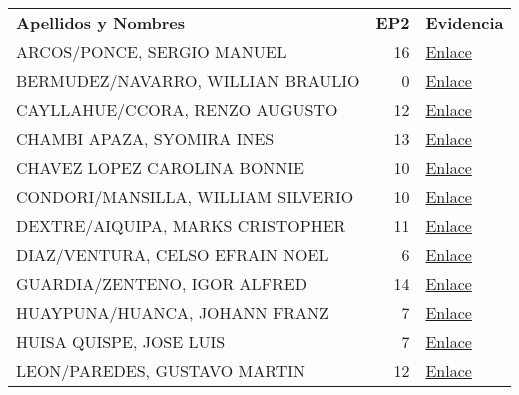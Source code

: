 \begin{table}[]
	\begin{tabular}{lrl}
		\textbf{Apellidos y Nombres   }   & \textbf{EP2} 			& \textbf{Evidencia} \\
		ARCOS/PONCE, SERGIO MANUEL          & 16                      & \href{https://drive.google.com/drive/folders/1pWcei0A3TyK1bauxECR_9CvgrQHozOu2?usp=sharing}{Enlace}    \\
BERMUDEZ/NAVARRO, WILLIAN BRAULIO   & 0   						& \href{https://drive.google.com/drive/folders/1pWcei0A3TyK1bauxECR_9CvgrQHozOu2?usp=sharing}{Enlace}    \\
CAYLLAHUE/CCORA, RENZO AUGUSTO      & 12                      & \href{https://drive.google.com/drive/folders/1pWcei0A3TyK1bauxECR_9CvgrQHozOu2?usp=sharing}{Enlace}    \\
CHAMBI APAZA, SYOMIRA INES          & 13                      & \href{https://drive.google.com/drive/folders/1pWcei0A3TyK1bauxECR_9CvgrQHozOu2?usp=sharing}{Enlace}    \\
CHAVEZ LOPEZ CAROLINA BONNIE        & 10                      & \href{https://drive.google.com/drive/folders/1pWcei0A3TyK1bauxECR_9CvgrQHozOu2?usp=sharing}{Enlace}    \\
CONDORI/MANSILLA, WILLIAM SILVERIO  & 10                      & \href{https://drive.google.com/drive/folders/1pWcei0A3TyK1bauxECR_9CvgrQHozOu2?usp=sharing}{Enlace}    \\
DEXTRE/AIQUIPA, MARKS CRISTOPHER    & 11                      & \href{https://drive.google.com/drive/folders/1pWcei0A3TyK1bauxECR_9CvgrQHozOu2?usp=sharing}{Enlace}    \\
DIAZ/VENTURA, CELSO EFRAIN NOEL     & 6                       & \href{https://drive.google.com/drive/folders/1pWcei0A3TyK1bauxECR_9CvgrQHozOu2?usp=sharing}{Enlace}    \\
GUARDIA/ZENTENO, IGOR ALFRED        & 14                      & \href{https://drive.google.com/drive/folders/1pWcei0A3TyK1bauxECR_9CvgrQHozOu2?usp=sharing}{Enlace}    \\
HUAYPUNA/HUANCA, JOHANN FRANZ       & 7                       & \href{https://drive.google.com/drive/folders/1pWcei0A3TyK1bauxECR_9CvgrQHozOu2?usp=sharing}{Enlace}    \\
HUISA QUISPE, JOSE LUIS             & 7                       & \href{https://drive.google.com/drive/folders/1pWcei0A3TyK1bauxECR_9CvgrQHozOu2?usp=sharing}{Enlace}    \\
LEON/PAREDES, GUSTAVO MARTIN        & 12                      & \href{https://drive.google.com/drive/folders/1pWcei0A3TyK1bauxECR_9CvgrQHozOu2?usp=sharing}{Enlace}    \\

\end{tabular}
\end{table}
